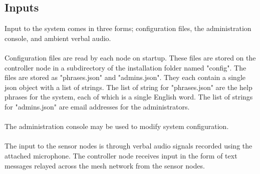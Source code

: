 \documentclass[11pt,a4paper]{article}
\begin{document}
\subsection{Inputs}
Input to the system comes in three forms; configuration files, the administration console, and ambient verbal audio. \\\\
Configuration files are read by each node on startup. These files are stored on the controller node in a subdirectory of the installation folder named "config".  The files are stored as "phrases.json" and "admins.json". They each contain a single json object with a list of strings. The list of string for "phrases.json" are the help phrases for the system, each of which is a single English word. The list of strings for "admins.json" are email addresses for the administrators. \\\\
The administration console may be used to modify system configuration. \\\\
The input to the sensor nodes is through verbal audio signals recorded using the attached microphone.  The controller node receives input in the form of text messages relayed across the mesh network from the sensor nodes.
\end{document}
